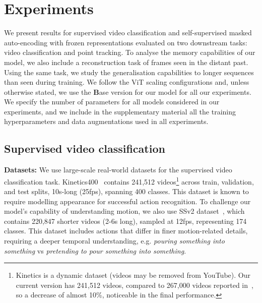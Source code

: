 

\section{Experiments}
\label{sec:experiments}

We present results for supervised video classification and self-supervised masked auto-encoding with frozen representations evaluated on two downstream tasks: video classification and point tracking. To analyse the memory capabilities of our model, we also include a reconstruction task of frames seen in the distant past. Using the same task, we study the generalisation capabilities to longer sequences than seen during training. We follow the ViT scaling configurations and, unless otherwise stated, we use the \textbf{B}ase version for our model for all our experiments. We specify the number of parameters for all models considered in our experiments, and we include in the supplementary material all the training hyperparameters and data augmentations used in all experiments.

\subsection{Supervised video classification}

\par \noindent \textbf{Datasets:}
We use large-scale real-world datasets for the supervised video classification task. Kinetics400~\citep{Carreira_2017_CVPR} contains 241,512 videos\footnote{Kinetics is a dynamic dataset (videos may be removed from
YouTube). Our current version has 241,512 videos, compared to 267,000 videos reported in~\cite{vivit}, so a decrease of almost 10\%, noticeable in the final performance.} across train, validation, and test splits, 10s-long (25fps), spanning 400 classes. This dataset is known to require modelling appearance for successful action recognition. To challenge our model's capability of understanding motion, we also use SSv2 dataset~\citep{goyal2017something}, which contains 220,847 shorter videos (2-6s long), sampled at 12fps, representing 174 classes. This dataset includes actions that differ in finer motion-related details, requiring a deeper temporal understanding, e.g. \textit{pouring something into something} vs \textit{pretending to pour something into something}. 

